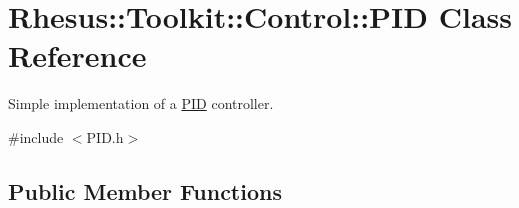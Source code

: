 \hypertarget{class_rhesus_1_1_toolkit_1_1_control_1_1_p_i_d}{\section{Rhesus\-:\-:Toolkit\-:\-:Control\-:\-:P\-I\-D Class Reference}
\label{class_rhesus_1_1_toolkit_1_1_control_1_1_p_i_d}
}


Simple implementation of a \hyperlink{class_rhesus_1_1_toolkit_1_1_control_1_1_p_i_d}{P\-I\-D} controller.  




{\ttfamily \#include $<$P\-I\-D.\-h$>$}

\subsection*{Public Member Functions}
